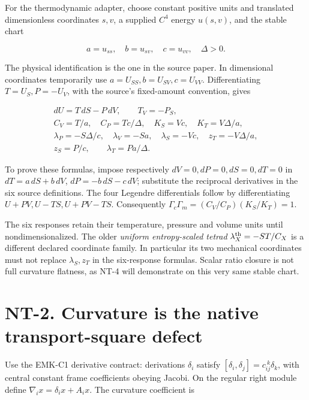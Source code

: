 \documentclass[
  11pt,
]{article}
\begin{document}
For the thermodynamic adapter, choose constant positive units and
translated dimensionless coordinates \(s,v\), a supplied \(C^4\) energy
\(u(s,v)\), and the stable chart

\[
a=u_{ss},\quad b=u_{sv},\quad c=u_{vv},\quad \Delta>0.
\]

The physical identification is the one in the source paper. In
dimensional coordinates temporarily use \(a=U_{SS},b=U_{SV},c=U_{VV}\).
Differentiating \(T=U_S,P=-U_V\), with the source's fixed-amount
convention, gives

\[
\begin{gathered}
dU=T\,dS-P\,dV,\qquad T_V=-P_S,\\
C_V=T/a,\quad C_P=Tc/\Delta,\quad
K_S=Vc,\quad K_T=V\Delta/a,\\
\lambda_P=-S\Delta/c,\quad \lambda_V=-Sa,\quad
\lambda_S=-Vc,\quad z_T=-V\Delta/a,\\
z_S=P/c,\qquad \lambda_T=Pa/\Delta.
\end{gathered}
\]

To prove these formulas, impose respectively \(dV=0,dP=0,dS=0,dT=0\) in
\(dT=a\,dS+b\,dV\), \(dP=-b\,dS-c\,dV\); substitute the reciprocal
derivatives in the six source definitions. The four Legendre
differentials follow by differentiating \(U+PV,U-TS,U+PV-TS\).
Consequently \(\Gamma_c\Gamma_m=(C_V/C_P)(K_S/K_T)=1\).

The six responses retain their temperature, pressure and volume units
until nondimensionalized. The older \emph{uniform entropy-scaled tetrad}
\(\lambda_X^{\rm th}=-ST/C_X\) is a different declared coordinate
family. In particular its two mechanical coordinates must not replace
\(\lambda_S,z_T\) in the six-response formulas. Scalar ratio closure is
not full curvature flatness, as NT-4 will demonstrate on this very same
stable chart.

\hypertarget{nt-2.-curvature-is-the-native-transport-square-defect}{%
\section{NT-2. Curvature is the native transport-square
defect}\label{nt-2.-curvature-is-the-native-transport-square-defect}}

Use the EMK-C1 derivative contract: derivations \(\delta_i\) satisfy
\([\delta_i,\delta_j]=c_{ij}^{\ k}\delta_k\), with central constant
frame coefficients obeying Jacobi. On the regular right module define
\(\nabla_i x=\delta_i x+A_ix\). The curvature coefficient is
\end{document}
